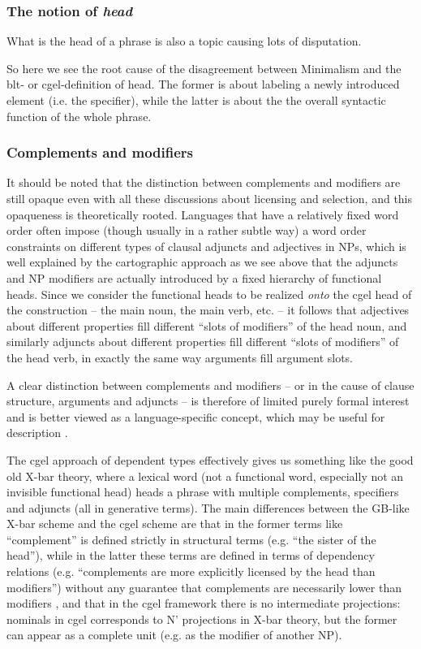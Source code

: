 \documentclass[../main.tex]{subfiles}
\begin{document}
\subsubsection{The notion of \emph{head}}\label{sec:headedness}

What is the head of a phrase is also a topic causing lots of disputation. 

So here we see the root cause of the disagreement between Minimalism and the \ac{blt}- or \ac{cgel}-definition 
of head. The former is about labeling a newly introduced element (i.e. the specifier), while the latter is about 
the the overall syntactic function of the whole phrase. 

\subsubsection{Complements and modifiers}

It should be noted that the distinction between complements and modifiers are still opaque even with 
all these discussions about licensing and selection, and this opaqueness is theoretically rooted. 
Languages that have a relatively fixed word order often impose (though usually in a rather subtle way) 
a word order constraints on different types of clausal adjuncts and adjectives in NPs, 
which is well explained by the cartographic approach as we see above that the adjuncts and NP modifiers 
are actually introduced by a fixed hierarchy of functional heads. Since we consider the functional heads 
to be realized \emph{onto} the \ac{cgel} head of the construction -- the main noun, the main verb, etc. -- 
it follows that adjectives about different properties fill different ``slots of modifiers'' of the head noun, 
and similarly adjuncts about different properties fill different ``slots of modifiers'' of the head verb, 
in exactly the same way arguments fill argument slots. 

A clear distinction between complements and modifiers -- or in the cause of clause structure, arguments and
adjuncts -- is therefore of limited purely formal interest and is better viewed as a language-specific concept, 
which may be useful for description \citep{haspelmath2014arguments}. 

The \ac{cgel} approach of dependent types effectively gives us something like the good old X-bar theory, where a lexical word 
(not a functional word, especially not an invisible functional head) heads a phrase with multiple 
complements, specifiers and adjuncts (all in generative terms). The main differences between the GB-like 
X-bar scheme and the \ac{cgel} scheme are that in the former terms like ``complement'' is defined strictly 
in structural terms (e.g. ``the sister of the head''), while in the latter these terms are defined in 
terms of dependency relations (e.g. ``complements are more explicitly licensed by the head than 
modifiers'') without any guarantee that complements are necessarily lower than modifiers \citep{payne2007fusion},
and that in the \ac{cgel} framework there is no intermediate projections: nominals in \ac{cgel} corresponds 
to N' projections in X-bar theory, but the former can appear as a complete unit (e.g. as the modifier of another 
NP). 
\end{document}
